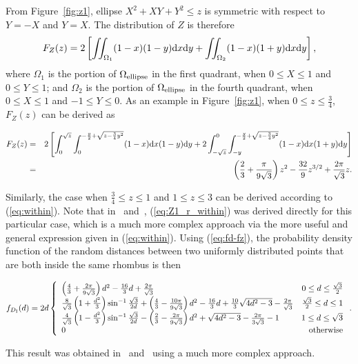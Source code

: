 \documentclass[12pt,draftclsnofoot,onecolumn]{IEEEtran}
\begin{document}
From Figure~\ref{fig:z1}, ellipse $X^2+XY+Y^2 \leq z$ is symmetric with respect
to $Y=-X$ and $Y=X$. The distribution of $Z$ is therefore
\begin{equation}\label{eq:within}
F_Z(z)=2\left[\iint_{\Omega_1}(1-x)(1-y){\rm d}x{\rm
d}y+\iint_{\Omega_2}(1-x)(1+y){\rm d}x{\rm d}y\right],
\end{equation}
where $\Omega_1$ is the portion of $\Omega_{\rm ellipse}$ in the first quadrant, 
when 
$0 \leq X\leq 1$ and $0 \leq Y \leq 1$; and $\Omega_2$ is the portion of 
$\Omega_{\rm ellipse}$ in the fourth quadrant, when
$0 \leq X \leq 1$ and $-1 \leq Y \leq 0$. As an example in Figure~\ref{fig:z1},
when $0\leq z \leq \frac{3}{4}$, $F_Z(z)$ can be derived as
\begin{small}
\begin{eqnarray}\label{eq:Z1_r_within}
F_Z(z)&=&2\left[\int_{0}^{\sqrt{z}}\int_{0}^{-\frac{y}{2}+\sqrt{z-\frac{3}{4}y^2
}}(1-x){\rm d}x(1-y){\rm
d}y+2\int_{-\sqrt{z}}^0\int_{-y}^{-\frac{y}{2}+\sqrt{z-\frac{3}{4}
y^2}}(1-x){\rm d}x(1+y){\rm d}y\right] \nonumber\\
&=&\left(\frac{2}{3}+\frac{\pi}{9\sqrt{3}}\right)z^2-\frac{32}{9}z^{3/2}+\frac{
2\pi}{\sqrt{3}}z.
\end{eqnarray}
\end{small}%
Similarly, the case when $\frac{3}{4} \leq z \leq 1$ and $1 \leq z \leq 3$ can
be derived according to (\ref{eq:within}). Note that in~\cite{zhuang2011random}
and~\cite{zhuang2012geometrical}, (\ref{eq:Z1_r_within}) was derived directly
for this particular case, which is a much more complex approach via the
more useful and general expression given in (\ref{eq:within}). Using (\ref{eq:fd-fz}), the
probability density function of the random distances between two uniformly
distributed points that are both inside the same rhombus is then
\begin{small}
 \begin{equation}\label{eq:fd_r_within}
  f_{D_{\rm I}}(d)=2d\left\{
    \begin{array}{lr}

\left(\frac{4}{3}+\frac{2\pi}{9\sqrt{3}}\right)d^2-\frac{16}{3}d+\frac{2\pi}{
\sqrt{3}} & 0\leq d\leq \frac{\sqrt{3}}{2}\\

\frac{8}{\sqrt{3}}\left(1+\frac{d^2}{3}\right)\sin^{-1}\frac{\sqrt{3}}{2d}
+\left(\frac{4}{3}-\frac{10\pi}{9\sqrt{3}}\right)d^2-\frac{16}{3}d+\frac{10}{3}
\sqrt{4d^2-3}-\frac{2\pi}{\sqrt{3}} & \frac{\sqrt{3}}{2}\leq d\leq 1\\

\frac{4}{\sqrt{3}}\left(1-\frac{d^2}{3}\right)\sin^{-1}\frac{\sqrt{3}}{2d}
-\left(\frac{2}{3}-\frac{2\pi}{9\sqrt{3}}\right)d^2+\sqrt{4d^2-3}-\frac{2\pi}{
3\sqrt{3}}-1 & 1\leq d\leq \sqrt{3} \\

      0 & {\rm otherwise}
    \end{array}
  \right..
\end{equation}
\end{small}
This result was obtained in~\cite{zhuang2011random} and~\cite{zhuang2012geometrical} using
a much more complex approach.
\end{document}
